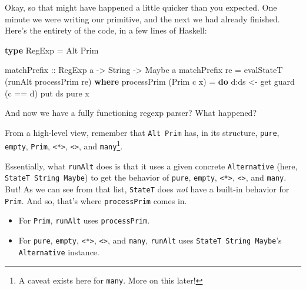 \documentclass[]{article}
\newenvironment{Shaded}{}{}
\newcommand{\DataTypeTok}[1]{\textcolor[rgb]{0.56,0.13,0.00}{#1}}
\newcommand{\FunctionTok}[1]{\textcolor[rgb]{0.02,0.16,0.49}{#1}}
\newcommand{\KeywordTok}[1]{\textcolor[rgb]{0.00,0.44,0.13}{\textbf{#1}}}
\newcommand{\NormalTok}[1]{#1}
\newcommand{\OperatorTok}[1]{\textcolor[rgb]{0.40,0.40,0.40}{#1}}
\newcommand{\OtherTok}[1]{\textcolor[rgb]{0.00,0.44,0.13}{#1}}
\begin{document}
Okay, so that might have happened a little quicker than you expected. One minute
we were writing our primitive, and the next we had already finished. Here's the
entirety of the code, in a few lines of Haskell:

\begin{Shaded}
\begin{Highlighting}[]
\KeywordTok{type} \DataTypeTok{RegExp} \OtherTok{=} \DataTypeTok{Alt} \DataTypeTok{Prim}

\OtherTok{matchPrefix ::} \DataTypeTok{RegExp}\NormalTok{ a }\OtherTok{{-}>} \DataTypeTok{String} \OtherTok{{-}>} \DataTypeTok{Maybe}\NormalTok{ a}
\NormalTok{matchPrefix re }\OtherTok{=}\NormalTok{ evalStateT (runAlt processPrim re)}
  \KeywordTok{where}
\NormalTok{    processPrim (}\DataTypeTok{Prim}\NormalTok{ c x) }\OtherTok{=} \KeywordTok{do}
\NormalTok{      d}\OperatorTok{:}\NormalTok{ds }\OtherTok{<{-}}\NormalTok{ get}
\NormalTok{      guard (c }\OperatorTok{==}\NormalTok{ d)}
\NormalTok{      put ds}
      \FunctionTok{pure}\NormalTok{ x}
\end{Highlighting}
\end{Shaded}

And now we have a fully functioning regexp parser? What happened?

From a high-level view, remember that \texttt{Alt\ Prim} has, in its structure,
\texttt{pure}, \texttt{empty}, \texttt{Prim},
\texttt{\textless{}*\textgreater{}},
\texttt{\textless{}\textbar{}\textgreater{}}, and \texttt{many}\footnote{A
  caveat exists here for \texttt{many}. More on this later!}.

Essentially, what \texttt{runAlt} does is that it uses a given concrete
\texttt{Alternative} (here, \texttt{StateT\ String\ Maybe}) to get the behavior
of \texttt{pure}, \texttt{empty}, \texttt{\textless{}*\textgreater{}},
\texttt{\textless{}\textbar{}\textgreater{}}, and \texttt{many}. But! As we can
see from that list, \texttt{StateT} does \emph{not} have a built-in behavior for
\texttt{Prim}. And so, that's where \texttt{processPrim} comes in.

\begin{itemize}
\tightlist
\item
  For \texttt{Prim}, \texttt{runAlt} uses \texttt{processPrim}.
\item
  For \texttt{pure}, \texttt{empty}, \texttt{\textless{}*\textgreater{}},
  \texttt{\textless{}\textbar{}\textgreater{}}, and \texttt{many},
  \texttt{runAlt} uses \texttt{StateT\ String\ Maybe}'s \texttt{Alternative}
  instance.
\end{itemize}
\end{document}
